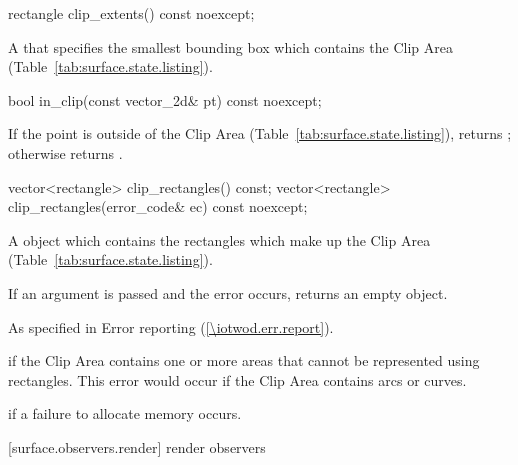 \begin{itemdecl}
rectangle clip_extents() const noexcept;
\end{itemdecl}
\begin{itemdescr}
\pnum
\returns
A  that specifies the smallest bounding box which contains the Clip Area (Table~\ref{tab:surface.state.listing}).
\end{itemdescr}

\begin{itemdecl}
bool in_clip(const vector_2d& pt) const noexcept;
\end{itemdecl}
\begin{itemdescr}
\pnum
\returns
If the point  is outside of the Clip Area (Table~\ref{tab:surface.state.listing}), returns ; otherwise returns .
\end{itemdescr}

\begin{itemdecl}
vector<rectangle> clip_rectangles() const;
vector<rectangle> clip_rectangles(error_code& ec) const noexcept;
\end{itemdecl}
\begin{itemdescr}
\pnum
\returns
A  object which contains the rectangles which make up the Clip Area (Table~\ref{tab:surface.state.listing}).

\pnum
If an  argument is passed and the error  occurs, returns an empty  object.

\pnum
\throws
As specified in Error reporting (\ref{\iotwod.err.report}).

\pnum
\errors
{} if the Clip Area contains one or more areas that cannot be represented using rectangles.
\enterexample
This error would occur if the Clip Area contains arcs or curves.
\exitexample

\pnum
{} if a failure to allocate memory occurs.
\end{itemdescr}

 [surface.observers.render] { render observers}

